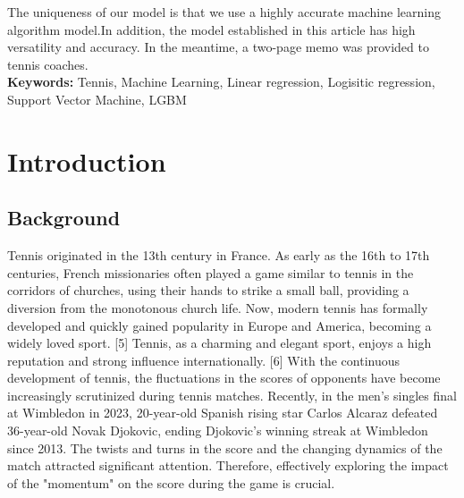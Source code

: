 \documentclass[12pt]{article}
\begin{document}
The uniqueness of our model is that we use a highly accurate machine learning algorithm model.In addition, the model established in this article has high versatility and accuracy. In the meantime, a two-page memo was provided to tennis coaches.
\\ \textbf{Keywords: } Tennis, Machine Learning, Linear regression, Logisitic regression, Support Vector Machine, LGBM
\pagestyle{fancy}
\fancyhf{} %
\fancyhead[R]{\thepage}

\fancyfoot[C]{\thepage} %
\fancyfoot[L]{\textcolor{gray}{Team 2417022}} %
\fancyfoot[R]{\textcolor{gray}{}} %

\newpage
\begin{center}
      \tableofcontents %
\end{center}
\newpage

\section{Introduction}
\subsection{Background}
Tennis originated in the 13th century in France. As early as the 16th to 17th centuries, French missionaries often played a game similar to tennis in the corridors of churches, using their hands to strike a small ball,
providing a diversion from the monotonous church life. Now, modern tennis has formally developed and quickly gained popularity in Europe and America, becoming a widely loved sport. [5] Tennis, as a charming and elegant sport, enjoys a high reputation and strong influence internationally. [6] With the continuous development of tennis, the fluctuations in the scores of opponents have become increasingly scrutinized during tennis matches. Recently, in the men's singles final at Wimbledon in 2023, 20-year-old Spanish rising star Carlos Alcaraz defeated 36-year-old Novak Djokovic, ending Djokovic's winning streak at Wimbledon since 2013. The twists and turns in the score and the changing dynamics of the match attracted significant attention. Therefore, effectively exploring the impact of the "momentum" on the score during the game is crucial.
\end{document}
